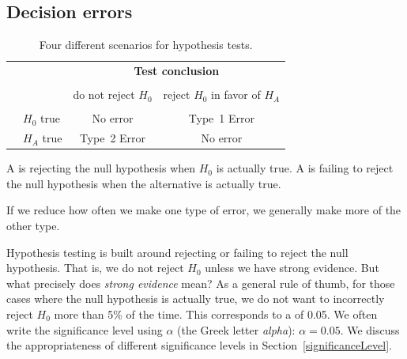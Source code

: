 \subsection{Decision errors}


\begin{table}%
\centering
\begin{tabular}{l l c c}
& & \multicolumn{2}{c}{\textbf{Test conclusion}} \\
  \cline{3-4}
\vspace{-3.7mm} \\
& & do not reject $H_0$ &  reject $H_0$ in favor of $H_A$ \\
  \cline{2-4}
\vspace{-3.7mm} \\
& $H_0$ true & No error &  Type~1 Error \\
\raisebox{1.5ex}{\textbf{Truth}} & $H_A$ true & Type~2 Error & No error \\
  \cline{2-4}
\end{tabular}
\caption{Four different scenarios for hypothesis tests.}
\label{fourHTScenarios}
\end{table}

A  is rejecting the null hypothesis when $H_0$ is actually true. A  is failing to reject the null hypothesis when the alternative is actually true.



If we reduce how often we make one type of error, we generally make more of the other type.

Hypothesis testing is built around rejecting or failing to reject the null hypothesis. That is, we do not reject $H_0$ unless we have strong evidence. But what precisely does \emph{strong evidence} mean? As a general rule of thumb, for those cases where the null hypothesis is actually true, we do not want to incorrectly reject $H_0$ more than 5\% of the time. This corresponds to a  of 0.05. We often write the significance level using $\alpha$ (the Greek letter \emph{alpha}): $\alpha = 0.05$. We discuss the appropriateness of different significance levels in Section~\ref{significanceLevel}.

